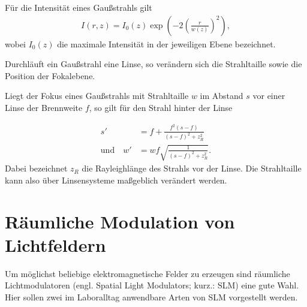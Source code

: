 \documentclass[
class=book,
accentcolor=1b,
custommargins=geometry,
fontsize=11pt,
thesis={type=Versuchsanleitung},
ruledheaders=all,
headline=false,
instbox=false,
marginpar=false,
title=small,
ignore-missing-data=true,
twoside=false,
pdfa=false %
]{apqpub}
\begin{document}
Für die Intensität eines Gaußstrahls gilt
\begin{align*}
I \left (r, z\right) = I_0 (z)
\exp \left( - 2 \left( \frac{r}{w \left( z \right)} \right)^2 \right) ,
\end{align*}
wobei $I_0 \left(z\right)$ die maximale Intensität in der jeweiligen Ebene bezeichnet.

Durchläuft ein Gaußstrahl eine Linse, so verändern sich die Strahltaille sowie die Position der Fokalebene.

Liegt der Fokus eines Gaußstrahls mit Strahltaille $w$ im Abstand $s$ vor einer Linse der Brennweite $f$, so gilt für den Strahl hinter der Linse

\begin{subequations}
\begin{align*}
s' &= f + \frac{f^2 \left( s - f \right)}{\left( s - f \right)^2 + z_R^2}  \\
\label{eq:gausswaist}
\text{und} \quad w' &= w f \sqrt{\frac{1}{\left(s-f\right)^2+z_R^2}}.
\end{align*}
\end{subequations}
Dabei bezeichnet $z_R$ die Rayleighlänge des Strahls vor der Linse.
Die Strahltaille kann also über Linsensysteme maßgeblich verändert werden.

	\section{Räumliche Modulation von Lichtfeldern}
Um möglichst beliebige elektromagnetische Felder zu erzeugen sind räumliche Lichtmodulatoren (engl. Spatial Light Modulators; kurz.: SLM) eine gute Wahl.
Hier sollen zwei im Laboralltag anwendbare Arten von SLM vorgestellt werden. 
\end{document}
